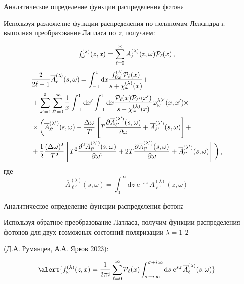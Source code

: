 \documentclass{beamer}
\newcommand{\dd}{\mathrm{d}}
\newcommand{\eee}{\mathrm{e}}
\begin{document}
\begin{frame}{ \small Аналитическое определение функции распределения фотона}
	\begin{center}
	Используя разложение функции распределения по полиномам Лежандра и выполняя преобразование Лапласа по $z$, получаем:
	\end{center}
	\scriptsize
	\begin{equation}\nonumber
		f_\omega^{(\lambda)}(z,x) = \sum_{\ell=0}^{\infty} A_\ell^{(\lambda)}(z,\omega) {\cal P}_\ell(x)\, ,
	\end{equation}
	\begin{equation}\label{eq:SysEqALap}\nonumber
		\begin{aligned}
			&\frac{2}{2 \ell +1} \overline{A}_\ell^{(\lambda)}(s,\omega) = \int_{-1}^{1} \dd x\frac{f_{0\omega}^{(\lambda)} {\cal P}_\ell(x)}{s+{\cal \chi}^{(\lambda)}_\omega(x)}+
			\\
			&+ \sum_{\lambda'=1}^{2}\sum_{\ell'=0}^{\infty}\frac{1}{x}\int_{-1}^{1}\dd x'\int_{-1}^{1}\dd x \frac{{\cal P}_\ell(x) {\cal P}_{\ell'}(x')}{s+{\cal \chi}_\omega^{(\lambda)}(x)} \varphi_\omega^{\lambda\lambda'}(x,x')\times
			\\
			&\times\bigg(\overline{A}_{\ell'}^{(\lambda')}(s,\omega) - \frac{\Delta \omega}{T}
			\left[
			T \frac{\partial \overline{A}_{\ell'}^{(\lambda')}(s,\omega)}{\partial \omega} + \overline{A}_{\ell'}^{(\lambda')}(s,\omega)
			\right]+
			\\
			&+ \frac{1}{2}\frac{(\Delta \omega)^2}{T^2}
			\left[
			T^2 \frac{\partial^2 \overline{A}_{\ell'}^{(\lambda')}(s,\omega)}{\partial \omega^2} + 2T \frac{\partial \overline{A}_{\ell'}^{(\lambda')}(s,\omega)}{\partial \omega}+\overline{A}_{\ell'}^{(\lambda')}(s,\omega)
			\right]\bigg)\, ,
		\end{aligned}
	\end{equation}
	где
	\begin{equation}\label{lapA}\nonumber
		\overline{A}_{\ell'}^{(\lambda)}(s,\omega)=\int_{0}^{\infty} \dd z\;\eee^{-sz} \,A^{(\lambda)}_{\ell'}(z,\omega) 
	\end{equation}
\end{frame}
\begin{frame}{ \small Аналитическое определение функции распределения фотона}
	 
	 \begin{center}
	Используя обратное преобразование Лапласа, получим функции распределения фотонов для двух возможных состояний поляризации $\lambda = 1,2$
	
	(Д.А. Румянцев, А.А. Ярков 2023):
	\end{center}
	\begin{equation}\nonumber
		\alert{	f_\omega^{(\lambda)}(z,x) = \frac{1}{2\pi i}\sum_{\ell=0}^{\infty} 
			{\cal P}_\ell(x)\int_{\sigma-i\infty}^{\sigma + i \infty}\dd s \; \eee^{sz} \,\overline{A}^{(\lambda)}_\ell(s,\omega)}
	\end{equation}
	
	
\end{frame}
\end{document}
